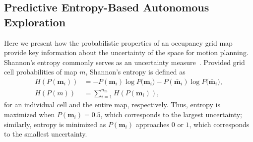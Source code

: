 \documentclass[smallextended]{svjour3}       %
\begin{document}
\subsection{Predictive Entropy-Based Autonomous Exploration}

Here we present how the probabilistic properties of an occupancy grid map provide key information about the uncertainty of the space for motion planning. Shannon's entropy commonly serves as an uncertainty measure~\cite{StaGriBur05}. Provided grid cell probabilities of map $m$, Shannon's entropy is defined as
\begin{align}
\label{eqn:ShannonsEntropyCell}
H(P(\mathbf{m}_i))&=-P(\mathbf{m}_i)\log{P(\mathbf{m}_i})-P(\bar{\mathbf{m}}_i)\log{P(\bar{\mathbf{m}}_i}),
\\
\label{eqn:ShannonsEntropyMap}
H(P(m))&=\sum_{i=1}^{n_m}H(P(\mathbf{m}_i)),
\end{align}
for an individual cell and the entire map, respectively.
Thus, entropy is maximized when $P(\mathbf{m}_i)=0.5$, which corresponds to the largest uncertainty; similarly, entropy is minimized as $P(\mathbf{m}_i)$ approaches $0$ or $1$, which corresponds to the smallest uncertainty. %
\end{document}
